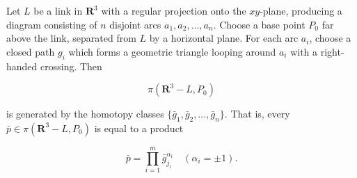 Let $L$ be a link in $\mathbf{R}^3$ with a regular projection onto the $xy$-plane, producing a diagram consisting of $n$ disjoint arcs $a_1, a_2, \ldots, a_n$. Choose a base point $P_0$ far above the link, separated from $L$ by a horizontal plane. For each arc $a_i$, choose a closed path $g_i$ which forms a geometric triangle looping around $a_i$ with a right-handed crossing. Then

$$\pi(\mathbf{R}^3 - L, P_0)$$

is generated by the homotopy classes $\{\bar{g}_1, \bar{g}_2, \ldots, \bar{g}_n\}$. That is, every $\bar{p} \in \pi(\mathbf{R}^3 - L, P_0)$ is equal to a product

$$\bar{p} = \prod_{i=1}^{m} \bar{g}_{j_i}^{\alpha_i} \quad (\alpha_i = \pm 1).$$
